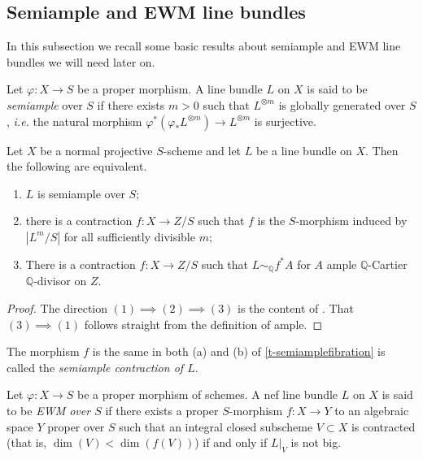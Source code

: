 	\subsection{Semiample and EWM line bundles}
	
	In this subsection we recall some basic results about semiample and EWM line bundles we will need later on. 
	
	\begin{definition}
		Let $\varphi \colon X \to S$ be a proper morphism. A line bundle $L$ on $X$ is said to be \textit{semiample} over $S$ if there exists $m>0$ such that $L^{\otimes m}$ is globally generated over $S$, \emph{i.e.} the natural morphism $\varphi^*(\varphi_*L^{\otimes m}) \to L^{\otimes m}$ is surjective.
	\end{definition} 
	
	\begin{theorem}\label{t-semiamplefibration}
		Let $X$ be a normal projective $S$-scheme and let $L$ be a line bundle on $X$. Then the following are equivalent.
		\begin{enumerate}
			\item $L$ is semiample over $S$;
			\item there is a contraction 
			$f\colon X\to Z/S$
			such that $f$ is the $S$-morphism induced by $|L^m/S|$ for all sufficiently divisible $m$;
			\item There is a contraction 
			$f\colon X\to Z/S$
			such that $L\sim_{\mathbb{Q}} f^{*}A$ for $A$ ample $\mathbb{Q}$-Cartier $\mathbb{Q}$-divisor on $Z$.
		\end{enumerate}
	\end{theorem}
	
	\begin{proof}
		The direction $(1) \implies (2) \implies (3)$ is the content of \cite[Theorem 2.1.26]{La1}. That $(3) \implies (1)$ follows straight from the definition of ample.
	\end{proof}
	
	The morphism $f$ is the same in both (a) and (b) of \autoref{t-semiamplefibration} is called the \textit{semiample contraction of $L$}.	
	
	\begin{definition}
	Let $\varphi \colon X \to S$ be a proper morphism of schemes. 
	A nef line bundle $L$ on $X$ is said to be \emph{EWM over $S$} if there exists a proper $S$-morphism $f \colon X \rightarrow Y$ to an algebraic space $Y$ proper over $S$ such that an integral closed subscheme $V \subset X$ is contracted (that is, $\dim(V) < \dim (f(V))$) if and only if $L|_V$ is not big. 
	\end{definition}
	
